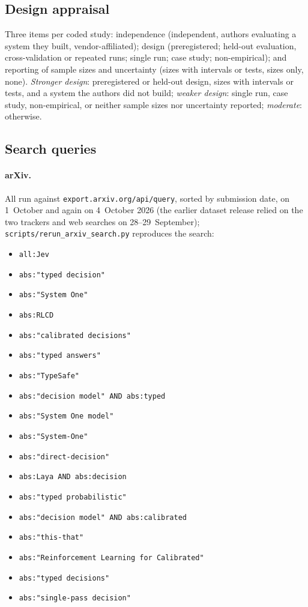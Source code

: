 \subsection{Design appraisal}
Three items per coded study: independence (independent, authors evaluating a system they built, vendor-affiliated); design (preregistered; held-out evaluation, cross-validation or repeated runs; single run; case study; non-empirical); and reporting of sample sizes and uncertainty (sizes with intervals or tests, sizes only, none).
\emph{Stronger design}: preregistered or held-out design, sizes with intervals or tests, and a system the authors did not build; \emph{weaker design}: single run, case study, non-empirical, or neither sample sizes nor uncertainty reported; \emph{moderate}: otherwise.

\subsection{Search queries}
\label{app:queries}
\paragraph{arXiv.}
All run against \texttt{export.arxiv.org/api/query}, sorted by submission date, on 1~October and again on 4~October 2026 (the earlier dataset release relied on the two trackers and web searches on 28--29~September); \texttt{scripts/rerun\_arxiv\_search.py} reproduces the search:
\begin{itemize}[nosep,leftmargin=1.5em]
  \item \nolinkurl{all:Jev}
  \item \nolinkurl{abs:"typed decision"}
  \item \nolinkurl{abs:"System One"}
  \item \nolinkurl{abs:RLCD}
  \item \nolinkurl{abs:"calibrated decisions"}
  \item \nolinkurl{abs:"typed answers"}
  \item \nolinkurl{abs:"TypeSafe"}
  \item \nolinkurl{abs:"decision model" AND abs:typed}
  \item \nolinkurl{abs:"System One model"}
  \item \nolinkurl{abs:"System-One"}
  \item \nolinkurl{abs:"direct-decision"}
  \item \nolinkurl{abs:Laya AND abs:decision}
  \item \nolinkurl{abs:"typed probabilistic"}
  \item \nolinkurl{abs:"decision model" AND abs:calibrated}
  \item \nolinkurl{abs:"this-that"}
  \item \nolinkurl{abs:"Reinforcement Learning for Calibrated"}
  \item \nolinkurl{abs:"typed decisions"}
  \item \nolinkurl{abs:"single-pass decision"}
\end{itemize}

